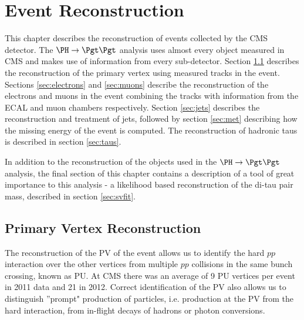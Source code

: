 \chapter{Event Reconstruction}
\label{chap:reco}

This chapter describes the reconstruction of events collected by the CMS
detector. The $\PH \to \Pgt\Pgt$ analysis uses almost every object measured in
CMS and makes use of information from every sub-detector. 
Section \ref{sec:vertex} describes the reconstruction of the
primary vertex using measured tracks in the event. Sections \ref{sec:electrons}
and \ref{sec:muons} describe the reconstruction of the electrons and muons in
the event combining the tracks with information from the \ac{ECAL} and muon
chambers respectively. Section \ref{sec:jets} describes the reconstruction and
treatment of jets, followed by section \ref{sec:met} describing how the missing
energy of the event is computed. The reconstruction of hadronic taus
is described in section \ref{sec:taus}.

In addition to the reconstruction of the objects used in the $\PH \to \Pgt\Pgt$
analysis, the final section of this chapter contains a description of a tool of
great importance to this analysis - a likelihood based reconstruction of the
di-tau pair mass, described in section \ref{sec:svfit}.

\section{Primary Vertex Reconstruction}
\label{sec:vertex}

The reconstruction of the \ac{PV} of the event allows us to identify the hard
$pp$ interaction over the other vertices from multiple $pp$ collisions in the same
bunch crossing, known as \ac{PU}. At CMS there was an average of 9
\ac{PU} vertices per event in 2011 data and 21 in 2012. Correct
identification of the \ac{PV} also allows us to distinguish ''prompt" production of
particles, i.e. production at the \ac{PV} from the hard interaction, from
in-flight decays of hadrons or photon conversions.  

